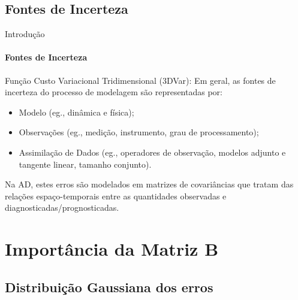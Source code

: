 \documentclass[10pt,aspectratio=169]{beamer}
\begin{document}
\subsection{Fontes de Incerteza}

\begin{frame}[fragile]{Introdução}
\framesubtitle{Fontes de Incerteza}
  \begin{block}{Função Custo Variacional Tridimensional (3DVar):}
    \vspace{0.5em}
    Em geral, as fontes de incerteza do processo de modelagem são representadas por:
    \begin{itemize}
      \item Modelo (eg., dinâmica e física);
      \item Observações (eg., medição, instrumento, grau de processamento);
      \item Assimilação de Dados (eg., operadores de observação, modelos adjunto e tangente linear, tamanho conjunto).
    \end{itemize}
    \pause
    \vspace{0.5em}
    Na AD, estes erros são modelados em matrizes de covariâncias que tratam das relações espaço-temporais entre as quantidades observadas e diagnosticadas/prognosticadas.
  \end{block}
  \vspace{0.5cm}
\end{frame}

\section{Importância da Matriz $\mathbf{B}$}

\subsection{Distribuição Gaussiana dos erros}
\end{document}
